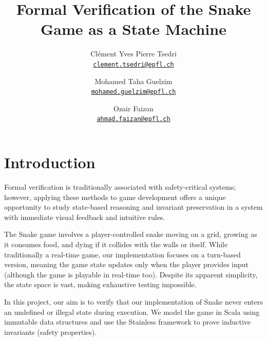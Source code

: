 \documentclass[letterpaper, 11pt]{article}
\title{Formal Verification of the Snake Game as a State Machine}
\author{
  Clément Yves Pierre Tsedri \\
      \texttt{\href{mailto:clement.tsedri@epfl.ch}{clement.tsedri@epfl.ch}} \and
  Mohamed Taha Guelzim \\
      \texttt{\href{mailto:mohamed.guelzim@epfl.ch}{mohamed.guelzim@epfl.ch}} \and
  Ozair Faizan \\
      \texttt{\href{mailto:ahmad.faizan@epfl.ch}{ahmad.faizan@epfl.ch}}
}
\date{}
\begin{document}
\maketitle
\setlength{\belowdisplayskip}{4pt} \setlength{\belowdisplayshortskip}{4pt}
\setlength{\abovedisplayskip}{4pt} \setlength{\abovedisplayshortskip}{4pt}




\section{Introduction}
Formal verification is traditionally associated with safety-critical systems; however, applying these
methods to game development offers a unique opportunity to study state-based reasoning
and invariant preservation in a system with immediate visual feedback and intuitive rules. 

The Snake game involves a player-controlled snake moving on a grid, growing as it consumes food, and
dying if it collides with the walls or itself. While traditionally a real-time game, our
implementation focuses on a turn-based version, meaning the game state updates only when the player
provides input (although the game is playable in real-time too).
Despite its apparent simplicity, the state space is vast, making exhaustive testing impossible.

In this project, our aim is to verify that our implementation of Snake never enters an undefined or
illegal state during execution. We model the game in Scala using immutable data structures and use
the Stainless framework to prove inductive invariants (safety properties).
\end{document}
